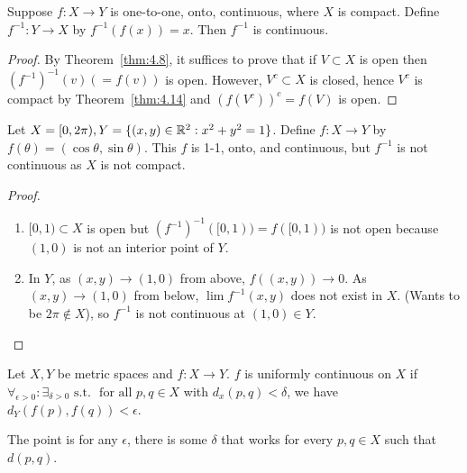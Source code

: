 \begin{theorem}[17]
	Suppose $f:X\to Y$ is one-to-one, onto, continuous, where $X$ is compact.
	Define $f^{-1}: Y\to X$ by $f^{-1}(f(x))=x$. Then $f^{-1}$ is continuous.
	\begin{proof}
		By Theorem~\ref{thm:4.8}, it suffices to prove that if $V \subset X$ is open then $(f^{-1})^{-1}(v)(=f(v))$ is open. However, $V^{c} \subset X$ is closed, hence $V^{c}$ is compact by Theorem~\ref{thm:4.14} and $(f(V^{c}))^{c}=f(V)$ is open.
	\end{proof}
\end{theorem}
\begin{example}
	Let $X=[0,2\pi), Y=\{(x,y) \in \mathbb{R}^{2}: x^2+y^2=1\}$. Define $f:X\to Y$ by $f(\theta)=(\cos{\theta},\sin{\theta})$.
	This $f$ is 1-1, onto, and continuous, but $f^{-1}$ is not continuous as $X$ is not compact.
	\begin{proof}
		\begin{enumerate}[label=(\arabic*)]
			\item $[0,1) \subset X$ is open but $(f^{-1})^{-1}([0,1))=f([0,1))$ is not open because $(1,0)$ is not an interior point of $Y$.
			\item In $Y$, as $(x,y)\to (1,0)$ from above, $f((x,y))\to 0$.
			      As $(x,y)\to (1,0)$ from below, $\lim{f^{-1}(x,y)}$ does not exist in $X$. (Wants to be $2\pi \not\in X$), so $f^{-1}$ is not continuous at $(1,0) \in Y$.
		\end{enumerate}
	\end{proof}
\end{example}

\begin{define}[18]
	Let $X,Y$ be metric spaces and $f:X\to Y$.
	$f$ is uniformly continuous on $X$ if $\forall_{\epsilon > 0}: \exists_{\delta > 0} \text{ s.t. } \text{ for all } p,q \in X$ with $d_x(p,q)<\delta$, we have $d_Y(f(p),f(q))<\epsilon$.
	\begin{remark}
		The point is for any $\epsilon$, there is some $\delta$ that works for every $p,q \in X$ such that $d(p,q)$.
	\end{remark}
\end{define}

